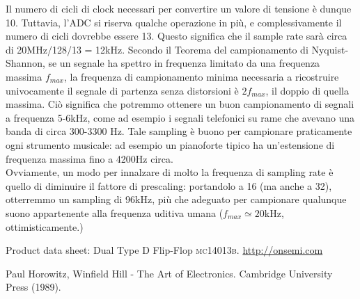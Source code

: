 \documentclass[journal, a4paper]{IEEEtran}
\begin{document}
Il numero di cicli di clock necessari per convertire un valore di tensione è dunque 10. Tuttavia, l'ADC si riserva qualche operazione in più, e complessivamente il numero di cicli dovrebbe essere 13. Questo significa che il sample rate sarà circa di 20MHz/128/13 = 12kHz. Secondo il Teorema del campionamento di Nyquist-Shannon, se un segnale ha spettro in frequenza limitato da una frequenza massima $f_{max}$, la frequenza di campionamento minima necessaria a ricostruire univocamente il segnale di partenza senza distorsioni è $2f_{max}$, il doppio di quella massima. Ciò significa che potremmo ottenere un buon campionamento di segnali a frequenza 5-6kHz, come ad esempio i segnali telefonici su rame che avevano una banda di circa 300-3300 Hz. Tale sampling è buono per campionare praticamente ogni strumento musicale: ad esempio un pianoforte tipico ha un'estensione di frequenza massima fino a 4200Hz circa.\\
Ovviamente, un modo per innalzare di molto la frequenza di sampling rate è quello di diminuire il fattore di prescaling: portandolo a 16 (ma anche a 32), otterremmo un sampling di 96kHz, più che adeguato per campionare qualunque suono appartenente alla frequenza uditiva umana ($f_{max} \simeq 20$kHz, ottimisticamente.)


\begin{thebibliography}{5}

	
	Product data sheet: Dual Type D Flip-Flop \textsc{mc14013b}.
	\url{http://onsemi.com}

	Paul Horowitz, Winfield Hill - The Art of Electronics. Cambridge University Press (1989).
	
\end{thebibliography}
\end{document}

